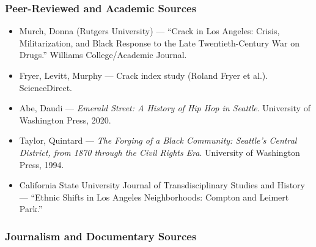 \documentclass[11pt,letterpaper]{article}
\begin{document}
\subsubsection{Peer-Reviewed and Academic Sources}

\begin{itemize}[leftmargin=1.5em]
  \item Murch, Donna (Rutgers University) --- ``Crack in Los Angeles: Crisis, Militarization, and Black Response to the Late Twentieth-Century War on Drugs.'' Williams College/Academic Journal.
  \item Fryer, Levitt, Murphy --- Crack index study (Roland Fryer et al.). ScienceDirect.
  \item Abe, Daudi --- \textit{Emerald Street: A History of Hip Hop in Seattle}. University of Washington Press, 2020.
  \item Taylor, Quintard --- \textit{The Forging of a Black Community: Seattle's Central District, from 1870 through the Civil Rights Era}. University of Washington Press, 1994.
  \item California State University Journal of Transdisciplinary Studies and History --- ``Ethnic Shifts in Los Angeles Neighborhoods: Compton and Leimert Park.''
\end{itemize}

\subsubsection{Journalism and Documentary Sources}
\end{document}
